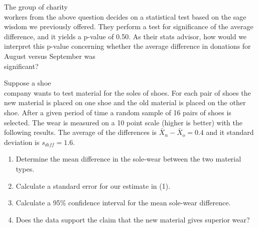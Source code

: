 \documentclass[11pt]{book}\usepackage[]{graphicx}\usepackage[]{color}
\begin{document}
\begin{exercises}
\begin{exercise}
\end{exercise}
\begin{solution}  %

\end{solution}

\begin{exercise}  %

The group of charity \\ workers from the above question decides on a statistical test based on the sage wisdom we previously offered. They perform a test for significance of the average difference, and it yields a p-value of 0.50. As their stats advisor, how would we interpret this p-value concerning  whether the average difference in donations for August versus September was \\ significant?
\end{exercise}
\begin{solution}  %

\end{solution}

\begin{exercise}  %

Suppose a shoe \\ company wants to test material for the soles of shoes.  For each pair of shoes the new material is placed on one shoe and the old material is placed on the other shoe.  After a given period of time a random sample of 16 pairs of shoes is selected.  The wear is measured on a 10 point scale (higher is better) with the following results.  The average of the differences is $\bar{X}_n - \bar{X}_o = 0.4$ and it standard deviation is $s_{diff} = 1.6$.

\begin{enumerate}
  \item Determine the mean difference in the sole-wear between the two material \\ types.        
  \item Calculate a standard error for our estimate in (1).
  \item Calculate a 95\% confidence interval for the mean sole-wear difference.
  \item Does the data support the claim that the new material gives superior wear?
\end{enumerate}

\end{exercise}
\begin{solution}  %




\end{solution}
\end{exercises}
\end{document}
